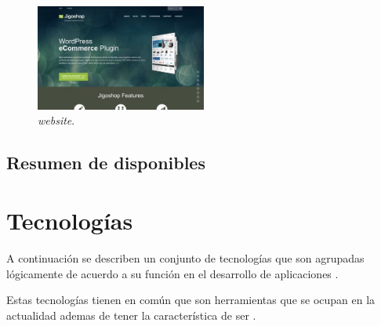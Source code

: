 \begin{itemize}
	\begin{figure}[H]
		\centering
		\includegraphics[width=0.5\textwidth]{figuras/cap1/JigoshopWebsite.jpg}
		\caption{\nameJigoshop \textit{website}\cite{online_Jigoshop}.}
	\end{figure}

\end{itemize}


\subsection{Resumen de \frameworks disponibles}



\section{Tecnologías }\label{cap:estadoArte:tecnologias}
A continuación se describen un conjunto de tecnologías que son agrupadas lógicamente de acuerdo a su función en el desarrollo de aplicaciones \web.

Estas tecnologías tienen en común que son herramientas que se ocupan en la actualidad ademas de tener la característica de ser \openSourcePC. 

